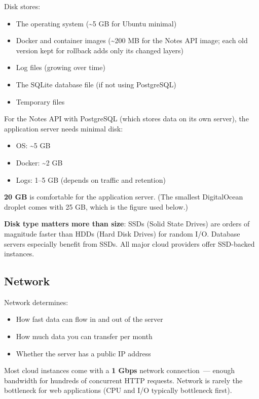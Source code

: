 Disk stores:

\begin{itemize}
\tightlist
\item
  The operating system (\textasciitilde5 GB for Ubuntu minimal)
\item
  Docker and container images (\textasciitilde200 MB for the Notes API image; each old version kept for rollback adds only its changed layers)
\item
  Log files (growing over time)
\item
  The SQLite database file (if not using PostgreSQL)
\item
  Temporary files
\end{itemize}

\noindent{}For the Notes API with PostgreSQL (which stores data on its own server), the application server needs minimal disk:

\begin{itemize}
\tightlist
\item
  OS: \textasciitilde5 GB
\item
  Docker: \textasciitilde2 GB
\item
  Logs: 1--5 GB (depends on traffic and retention)
\end{itemize}

\noindent{}\textbf{20 GB} is comfortable for the application server. (The smallest DigitalOcean droplet comes with 25 GB, which is the figure used below.)

\textbf{Disk type matters more than size}: SSDs (Solid State Drives) are orders of magnitude faster than HDDs (Hard Disk Drives) for random I/O. Database servers especially benefit from SSDs. All major cloud providers offer SSD-backed instances.

\subsection*{Network}\label{20-server-fundamentals:network}

Network determines:

\begin{itemize}
\tightlist
\item
  How fast data can flow in and out of the server
\item
  How much data you can transfer per month
\item
  Whether the server has a public IP address
\end{itemize}

\noindent{}Most cloud instances come with a \textbf{1 Gbps} network connection~--- enough bandwidth for hundreds of concurrent HTTP requests. Network is rarely the bottleneck for web applications (CPU and I/O typically bottleneck first).

